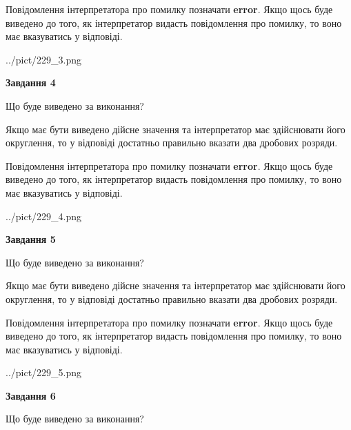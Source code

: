 \documentclass[12pt, ukrainian]{article}
\begin{document}
{\begin {Large}
Повідомлення інтерпретатора про помилку позначати \textbf{error}.
Якщо щось буде виведено до того, як інтерпретатор видасть повідомлення про помилку, 
то воно має вказуватись у відповіді. \par

\begin{center}
	{../pict/229_3.png}
\end{center}
\newpage

{\begin {center}\textbf{Завдання 4}\end {center}}\par
Що буде виведено за виконання? \par

Якщо має бути виведено дійсне значення та інтерпретатор має здійснювати його округлення, 
то у відповіді достатньо правильно вказати два дробових розряди.

Повідомлення інтерпретатора про помилку позначати \textbf{error}.
Якщо щось буде виведено до того, як інтерпретатор видасть повідомлення про помилку, 
то воно має вказуватись у відповіді. \par

\begin{center}
	{../pict/229_4.png}
\end{center}
\newpage

{\begin {center}\textbf{Завдання 5}\end {center}}\par
Що буде виведено за виконання? \par

Якщо має бути виведено дійсне значення та інтерпретатор має здійснювати його округлення, 
то у відповіді достатньо правильно вказати два дробових розряди.

Повідомлення інтерпретатора про помилку позначати \textbf{error}.
Якщо щось буде виведено до того, як інтерпретатор видасть повідомлення про помилку, 
то воно має вказуватись у відповіді. \par

\begin{center}
	{../pict/229_5.png}
\end{center}
\newpage

{\begin {center}\textbf{Завдання 6}\end {center}}\par
Що буде виведено за виконання? \par


\end{Large}}
\end{document}
